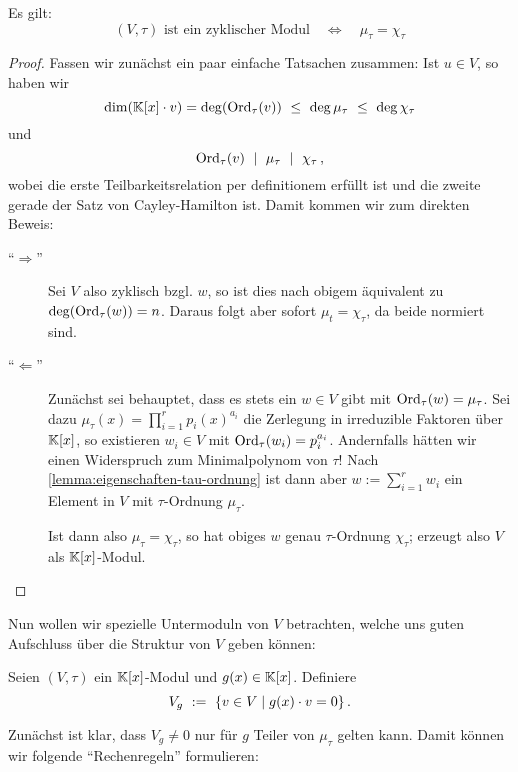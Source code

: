 \begin{satz}
  Es gilt:
  \[ (V,\tau) \text{ ist ein zyklischer Modul} \quad\Leftrightarrow\quad
    \mu_\tau = \chi_\tau\]
\end{satz}
\begin{proof}
  Fassen wir zunächst ein paar einfache Tatsachen zusammen:
  Ist $u \in V$, so haben wir 
  \[ \dim(\mathbb{K}[x]\cdot v) = \deg( \operatorname{Ord}_\tau(v) ) \ \leq\  
    \deg\mu_\tau \ \leq\  \deg \chi_\tau \]
  und 
  \[ \operatorname{Ord}_\tau (v) \ \mid\  \mu_\tau \ \mid\  \chi_\tau \,,\]
  wobei die erste Teilbarkeitsrelation per definitionem erfüllt ist und die
  zweite gerade der Satz von Cayley-Hamilton ist.
  Damit kommen wir zum direkten Beweis:
  \begin{description}
    \item["`$\Rightarrow$"'] Sei $V$ also zyklisch bzgl. $w$, so ist dies nach
      obigem äquivalent zu $\deg(\operatorname{Ord}_\tau(w)) = n$. Daraus folgt aber sofort
      $\mu_t = \chi_\tau$, da beide normiert sind.
    \item["`$\Leftarrow$"'] Zunächst sei behauptet, dass es stets ein 
      $w \in V$ gibt mit $\operatorname{Ord}_\tau(w) = \mu_\tau$. Sei dazu 
      $\mu_\tau(x) = \prod_{i=1}^r p_i(x)^{a_i}$ die Zerlegung in irreduzible
      Faktoren über $\mathbb{K}[x]$, so existieren $w_i \in V$ mit
      $\operatorname{Ord}_\tau(w_i) = p_i^{a_i}$. Andernfalls hätten wir einen Widerspruch 
      zum Minimalpolynom von $\tau$!
      Nach \autoref{lemma:eigenschaften-tau-ordnung} ist dann aber 
      $w := \sum_{i=1}^r w_i$ ein Element in $V$ mit $\tau$-Ordnung $\mu_\tau$.

      Ist dann also $\mu_\tau = \chi_\tau$, so hat obiges $w$ genau
      $\tau$-Ordnung $\chi_\tau$; erzeugt also $V$ als $\mathbb{K}[x]$-Modul.
  \end{description}
\end{proof}

Nun wollen wir spezielle Untermoduln von $V$ betrachten, welche uns guten
Aufschluss über die Struktur von $V$ geben können:

\begin{notation}
  Seien $(V,\tau)$ ein $\mathbb{K}[x]$-Modul und $g(x) \in \mathbb{K}[x]$.
  Definiere
  \[ V_g \ :=\  \{ v \in V \mid g(x)\cdot v = 0 \}\,.\]
\end{notation}

Zunächst ist klar, dass $V_g \neq 0$ nur für $g$ Teiler von $\mu_\tau$ gelten
kann. Damit können wir folgende "`Rechenregeln"' formulieren:

